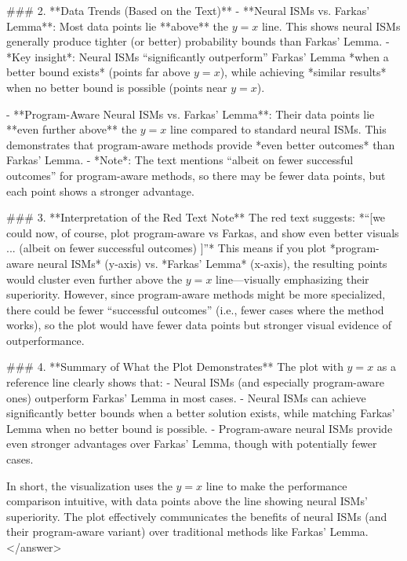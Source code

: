 ### 2. **Data Trends (Based on the Text)**  
- **Neural ISMs vs. Farkas' Lemma**: Most data points lie **above** the \( y = x \) line. This shows neural ISMs generally produce tighter (or better) probability bounds than Farkas' Lemma.  
  - *Key insight*: Neural ISMs “significantly outperform” Farkas' Lemma *when a better bound exists* (points far above \( y = x \)), while achieving *similar results* when no better bound is possible (points near \( y = x \)).  

- **Program-Aware Neural ISMs vs. Farkas' Lemma**: Their data points lie **even further above** the \( y = x \) line compared to standard neural ISMs. This demonstrates that program-aware methods provide *even better outcomes* than Farkas' Lemma.  
  - *Note*: The text mentions “albeit on fewer successful outcomes” for program-aware methods, so there may be fewer data points, but each point shows a stronger advantage.  


### 3. **Interpretation of the Red Text Note**  
The red text suggests: *“[we could now, of course, plot program-aware vs Farkas, and show even better visuals ... (albeit on fewer successful outcomes) ]”*  
This means if you plot *program-aware neural ISMs* (y-axis) vs. *Farkas' Lemma* (x-axis), the resulting points would cluster even further above the \( y = x \) line—visually emphasizing their superiority. However, since program-aware methods might be more specialized, there could be fewer “successful outcomes” (i.e., fewer cases where the method works), so the plot would have fewer data points but stronger visual evidence of outperformance.  


### 4. **Summary of What the Plot Demonstrates**  
The plot with \( y = x \) as a reference line clearly shows that:  
- Neural ISMs (and especially program-aware ones) outperform Farkas' Lemma in most cases.  
- Neural ISMs can achieve significantly better bounds when a better solution exists, while matching Farkas' Lemma when no better bound is possible.  
- Program-aware neural ISMs provide even stronger advantages over Farkas' Lemma, though with potentially fewer cases.  


In short, the visualization uses the \( y = x \) line to make the performance comparison intuitive, with data points above the line showing neural ISMs’ superiority. The plot effectively communicates the benefits of neural ISMs (and their program-aware variant) over traditional methods like Farkas' Lemma.</answer>